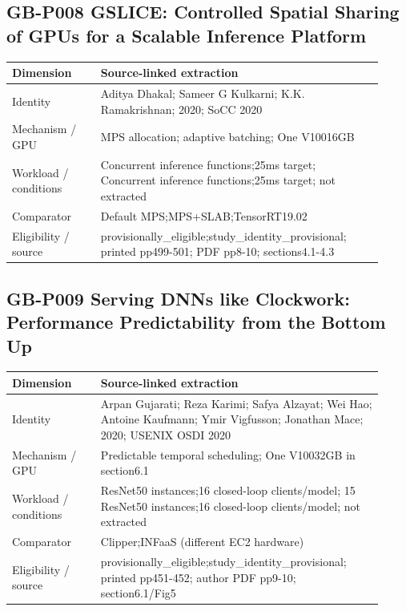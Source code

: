 \documentclass[12pt,a4paper]{article}
\begin{document}
\subsection*{GB-P008 GSLICE:\allowbreak{} Controlled Spatial Sharing of GPUs for a Scalable Inference Platform}
\cite{GB-P008}

{\small\begin{longtable}{>{\raggedright\arraybackslash}p{0.22\linewidth}>{\raggedright\arraybackslash}p{0.7\linewidth}}
\toprule
Dimension & Source-linked extraction\\\midrule
\endhead
Identity & Aditya Dhakal; Sameer G Kulkarni; K.K. Ramakrishnan; 2020; SoCC 2020\\
Mechanism /\allowbreak{} GPU & MPS allocation; adaptive batching; One V10016GB\\
Workload /\allowbreak{} conditions & Concurrent inference functions;25ms target; Concurrent inference functions;25ms target; not extracted\\
Comparator & Default MPS;MPS+SLAB;TensorRT19.02\\
Eligibility /\allowbreak{} source & provisionally\_\allowbreak{}eligible;study\_\allowbreak{}identity\_\allowbreak{}provisional; printed pp499-501; PDF pp8-10; sections4.1-4.3\\
\bottomrule
\end{longtable}}

\subsection*{GB-P009 Serving DNNs like Clockwork:\allowbreak{} Performance Predictability from the Bottom Up}
\cite{GB-P009}

{\small\begin{longtable}{>{\raggedright\arraybackslash}p{0.22\linewidth}>{\raggedright\arraybackslash}p{0.7\linewidth}}
\toprule
Dimension & Source-linked extraction\\\midrule
\endhead
Identity & Arpan Gujarati; Reza Karimi; Safya Alzayat; Wei Hao; Antoine Kaufmann; Ymir Vigfusson; Jonathan Mace; 2020; USENIX OSDI 2020\\
Mechanism /\allowbreak{} GPU & Predictable temporal scheduling; One V10032GB in section6.1\\
Workload /\allowbreak{} conditions & 15 ResNet50 instances;16 closed-loop clients/\allowbreak{}model; 15 ResNet50 instances;16 closed-loop clients/\allowbreak{}model; not extracted\\
Comparator & Clipper;INFaaS (different EC2 hardware)\\
Eligibility /\allowbreak{} source & provisionally\_\allowbreak{}eligible;study\_\allowbreak{}identity\_\allowbreak{}provisional; printed pp451-452; author PDF pp9-10; section6.1/\allowbreak{}Fig5\\
\bottomrule
\end{longtable}}
\end{document}
